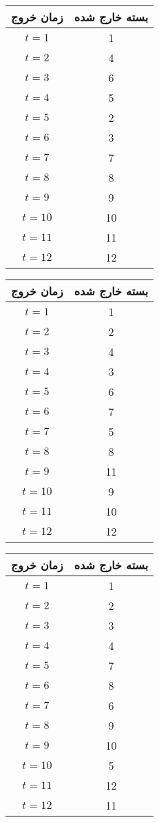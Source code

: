 


\begin{center}
	\begin{tabular}{|c|c|}
		\hline
		زمان خروج & بسته خارج شده \\
		\hline
		$t=1$ & 1 \\
		$t=2$ & 4 \\
		$t=3$ & 6 \\
		$t=4$ & 5 \\
		$t=5$ & 2 \\
		$t=6$ & 3 \\
		$t=7$ & 7 \\
		$t=8$ & 8 \\
		$t=9$ & 9 \\
		$t=10$ & 10 \\
		$t=11$ & 11 \\
		$t=12$ & 12 \\
		\hline
	\end{tabular}
\end{center}

\vspace{1cm}




\begin{center}
	\begin{tabular}{|c|c|}
		\hline
		زمان خروج & بسته خارج شده \\
		\hline
		$t=1$ & 1\\
		$t=2$ &  2 \\
		$t=3$ &  4\\
		$t=4$ &  3\\
		$t=5$ &  6\\
		$t=6$ & 7\\
		$t=7$ & 5\\
		$t=8$ & 8\\
		$t=9$ & 11\\
		$t=10$ &9\\
		$t=11$ & 10\\
		$t=12$ & 12 \\
		\hline
	\end{tabular}
\end{center}

\vspace{1cm}




\begin{center}
	\begin{tabular}{|c|c|}
		\hline
		زمان خروج & بسته خارج شده \\
		\hline
		$t=1$ & 1\\
$t=2$ &  2 \\
$t=3$ &  3\\
$t=4$ &  4\\
$t=5$ &  7\\
$t=6$ & 8\\
$t=7$ & 6\\
$t=8$ & 9\\
$t=9$ & 10\\
$t=10$ &5\\
$t=11$ & 12\\
$t=12$ & 11 \\
		\hline
	\end{tabular}
\end{center}